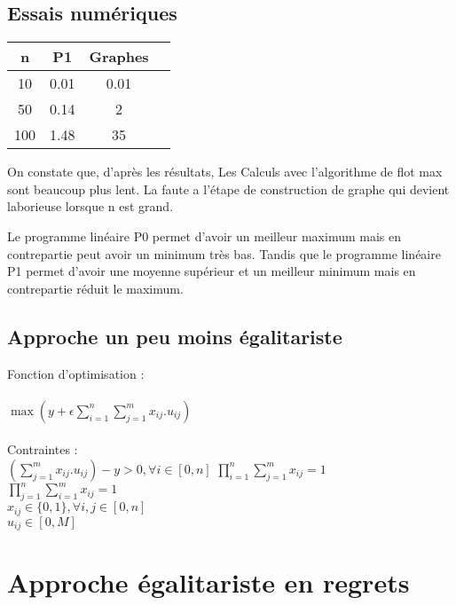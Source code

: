 \documentclass[paper=a4, fontsize=11pt]{scrartcl} %
\numberwithin{equation}{section} %
\numberwithin{figure}{section} %
\numberwithin{table}{section} %
\begin{document}
\subsection{Essais num\'eriques}

\begin{tabular}{|*{4}{c|}}
    \hline
     n  & P1  & Graphes\\
    \hline
     10  & 0.01  & 0.01\\
    \hline
     50  & 0.14  & 2\\
    \hline
     100  & 1.48  & 35\\
    \hline
\end{tabular}

On constate que, d'apr\`es les r\'esultats, Les Calculs avec l'algorithme de flot max sont beaucoup plus lent.
La faute a l'\'etape de construction de graphe qui devient laborieuse lorsque n est grand.

Le programme lin\'eaire P0 permet d'avoir un meilleur maximum
mais en contrepartie peut avoir un minimum tr\`es bas. 
Tandis que le programme lin\'eaire P1 permet d'avoir une moyenne 
sup\'erieur et un meilleur minimum mais en contrepartie r\'eduit le maximum.

\subsection{Approche un peu moins \'egalitariste}

Fonction d'optimisation : \\\\
$\max (y+\epsilon\sum_{i=1}^{n}\sum_{j=1}^{m}x_{ij}.u_{ij})$\\\\
Contraintes :\\

$(\sum_{j=1}^{m}x_{ij}.u_{ij})-y > 0, \forall i \in [0,n]$
$\prod_{i=1}^{n}\sum_{j=1}^{m}x_{ij} = 1$\\
$\prod_{j=1}^{n}\sum_{i=1}^{m}x_{ij} = 1$\\
$x_{ij}\in\{0,1\}, \forall i,j\in[0,n]$\\
$u_{ij}\in[0,M]$




\newpage
\section{Approche \'egalitariste en regrets}
\end{document}

